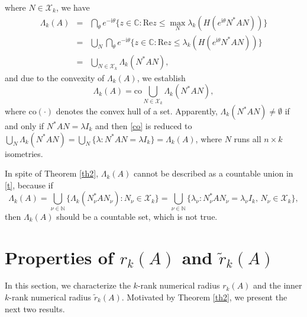 \documentclass[12pt, reqno]{amsart}
\theoremstyle{definition}
\theoremstyle{remark}
\numberwithin{equation}{section}
\begin{document}
where $N\in\mathcal{X}_{k}$, we have
\begin{eqnarray}\label{t}
\nonumber\Lambda_{k}(A) & = & \bigcap_{\theta}{e^{-\mathrm{i}\theta}\{z\in\mathbb{C} : \mathrm{Re}z \leq \max_{N}{\lambda_{k}(H(e^{\mathrm{i}\theta}N^{*}AN))}\}}\\
\nonumber     & = & \bigcup_{N}{\bigcap_{\theta}{e^{-\mathrm{i}\theta}\{z\in\mathbb{C} : \mathrm{Re}z \leq \lambda_{k}(H(e^{\mathrm{i}\theta}N^{*}AN))\}}}\\
              & = & \bigcup_{N\in\mathcal{X}_{k}}{\Lambda_{k}(N^{*}AN)},
\end{eqnarray}
and due to the convexity of $\Lambda_{k}(A)$, we establish
\begin{equation}\label{co}
\Lambda_{k}(A)=\mathrm{co}\bigcup_{N\in\mathcal{X}_{k}}{\Lambda_{k}(N^{*}AN)},
\end{equation}
where $\mathrm{co}(\cdot)$ denotes the convex hull of a set. Apparently, $\Lambda_{k}(N^{*}AN)\neq\emptyset$ if and only if
$N^{*}AN=\lambda I_{k}$ \cite{Poon-Li-Sze} and then \eqref{co} is reduced to $\bigcup_{N}{\Lambda_{k}(N^{*}AN)}=\bigcup_{N}{\{\lambda: N^{*}AN=\lambda I_{k}\}}=\Lambda_{k}(A)$, where $N$ runs all $n\times k$ isometries.

In spite of Theorem \ref{th2}, $\Lambda_{k}(A)$ cannot be described as a countable union in \eqref{t}, because if
\[
\Lambda_{k}(A)=\bigcup_{\nu\in\mathbb{N}}\{\Lambda_{k}(N^{*}_{\nu}AN_{\nu}): N_{\nu}\in\mathcal{X}_{k}\}=
\bigcup_{\nu\in\mathbb{N}}\{\lambda_{\nu}:N^{*}_{\nu}AN_{\nu}=\lambda_{\nu}I_{k},\,N_{\nu}\in\mathcal{X}_{k}\},
\]
then $\Lambda_{k}(A)$ should be a countable set, which is not true.

\section{Properties of $r_{k}(A)$ and $\widetilde{r}_{k}(A)$}
In this section,  we characterize the $k$-rank numerical radius $r_{k}(A)$ and the inner $k$-rank numerical radius $\widetilde{r}_{k}(A)$. Motivated by Theorem \ref{th2}, we present the next two results.
\end{document}
